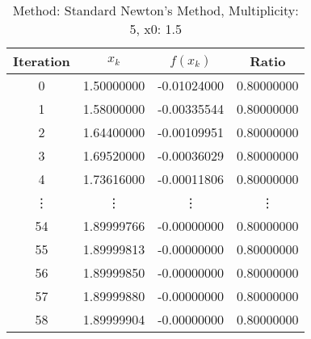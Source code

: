 \begin{table}
\centering
\caption{Method: Standard Newton's Method, Multiplicity: 5, x0: 1.5}
\label{tab:table_Standard_Newton's_Method_5_1_5}
\begin{tabular}{c c c c}
\toprule
Iteration &      $x_k$ &    $f(x_k)$ &      Ratio \\
\midrule
        0 & 1.50000000 & -0.01024000 & 0.80000000 \\
        1 & 1.58000000 & -0.00335544 & 0.80000000 \\
        2 & 1.64400000 & -0.00109951 & 0.80000000 \\
        3 & 1.69520000 & -0.00036029 & 0.80000000 \\
        4 & 1.73616000 & -0.00011806 & 0.80000000 \\
   \vdots &     \vdots &      \vdots &     \vdots \\
       54 & 1.89999766 & -0.00000000 & 0.80000000 \\
       55 & 1.89999813 & -0.00000000 & 0.80000000 \\
       56 & 1.89999850 & -0.00000000 & 0.80000000 \\
       57 & 1.89999880 & -0.00000000 & 0.80000000 \\
       58 & 1.89999904 & -0.00000000 & 0.80000000 \\
\bottomrule
\end{tabular}
\end{table}
